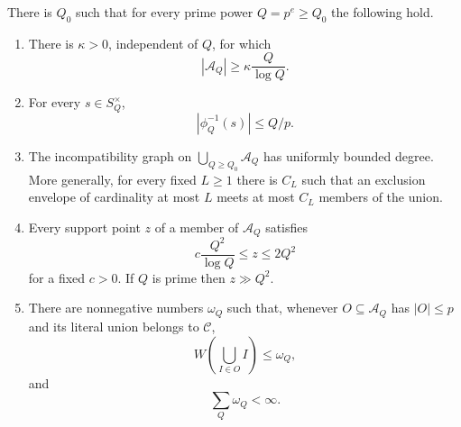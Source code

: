 \begin{proposition}\label{prop:signed-inverse-capabilities}
There is $Q_0$ such that for every prime power $Q=p^e\ge Q_0$ the following hold.
\begin{enumerate}
\item There is $\kappa>0$, independent of $Q$, for which
\begin{equation}\label{eq:family-size}
|\mathcal A_Q|\ge \kappa\frac Q{\log Q}.
\end{equation}
\item For every $s\in S_Q^\times$,
\begin{equation}\label{eq:fibre-bound}
|\phi_Q^{-1}(s)|\le Q/p.
\end{equation}
\item The incompatibility graph on $\bigcup_{Q\ge Q_0}\mathcal A_Q$ has uniformly bounded degree.  More generally, for every fixed $L\ge1$ there is $C_L$ such that an exclusion envelope of cardinality at most $L$ meets at most $C_L$ members of the union.
\item Every support point $z$ of a member of $\mathcal A_Q$ satisfies
\begin{equation}\label{eq:support-window}
c\frac{Q^2}{\log Q}\le z\le2Q^2
\end{equation}
for a fixed $c>0$.  If $Q$ is prime then $z\gg Q^2$.
\item There are nonnegative numbers $\omega_Q$ such that, whenever $O\subseteq\mathcal A_Q$ has $|O|\le p$ and its literal union belongs to $\mathcal C$,
\[
W\!\left(\bigcup_{I\in O}I\right)\le\omega_Q,
\]
and
\begin{equation}\label{eq:role-summable}
\sum_Q\omega_Q<\infty.
\end{equation}
\end{enumerate}
\end{proposition}

